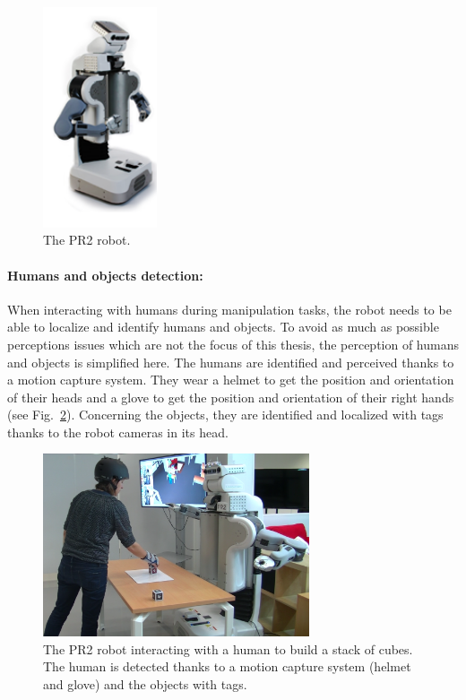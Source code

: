 \documentclass[english,a4paper,11pt,twoside]{StyleThese}
\begin{document}
\begin{figure}[!h]
	\centering
    \includegraphics[width=0.3\textwidth]{figs/Introduction/PR2.png}
    \caption{The PR2 robot.}
    \label{fig:PR2}
\end{figure}

\paragraph{Humans and objects detection:} When interacting with humans during manipulation tasks, the robot needs to be able to localize and identify humans and objects. To avoid as much as possible perceptions issues which are not the focus of this thesis, the perception of humans and objects is simplified here. The humans are identified and perceived thanks to a motion capture system. They wear a helmet to get the position and orientation of their heads and a glove to get the position and orientation of their right hands (see Fig.~\ref{fig:Environment}). Concerning the objects, they are identified and localized with tags thanks to the robot cameras in its head.

\begin{figure}[!h]
	\centering
    \includegraphics[width=0.7\textwidth]{figs/Introduction/SetUp.png}
    \caption{The PR2 robot interacting with a human to build a stack of cubes. The human is detected thanks to a motion capture system (helmet and glove) and the objects with tags.}
    \label{fig:Environment}
\end{figure}
\end{document}
